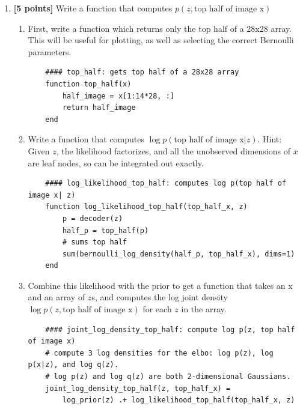 \documentclass{article}
\begin{document}
\begin{enumerate}[label=(\alph*)]	
	\item {\bf [5 points]} Write a function that computes $p(z, \text{top half of image x})$
	
	\begin{enumerate}[label=(\alph*)]
	\item First, write a function which returns only the top half of a 28x28 array. This will be useful for plotting, as well as selecting the correct Bernoulli parameters.
	
	\begin{lstlisting}
	#### top_half: gets top half of a 28x28 array
	function top_half(x)
		half_image = x[1:14*28, :]
		return half_image
	end
	\end{lstlisting}
	
    \item Write a function that computes $\log p(\text{top half of image x} | z)$. Hint: Given $z$, the likelihood factorizes, and all the unobserved dimensions of $x$ are leaf nodes, so can be integrated out exactly. 
	
	\begin{lstlisting}
	#### log_likelihood_top_half: computes log p(top half of image x| z)
	function log_likelihood_top_half(top_half_x, z)
		p = decoder(z)
		half_p = top_half(p)
		# sums top half
		sum(bernoulli_log_density(half_p, top_half_x), dims=1)
	end
	\end{lstlisting}
	
	\item Combine this likelihood with the prior to get a function that takes an x and an array of $z$s, and computes the log joint density $\log p(z, \text{top half of image x})$ for each $z$ in the array.
	
	\begin{lstlisting}
	#### joint_log_density_top_half: compute log p(z, top half of image x)
	# compute 3 log densities for the elbo: log p(z), log p(x|z), and log q(z).
	# log p(z) and log q(z) are both 2-dimensional Gaussians.
	joint_log_density_top_half(z, top_half_x) = 
		log_prior(z) .+ log_likelihood_top_half(top_half_x, z)
	\end{lstlisting}	

\end{enumerate}

	

\end{enumerate}
\end{document}
